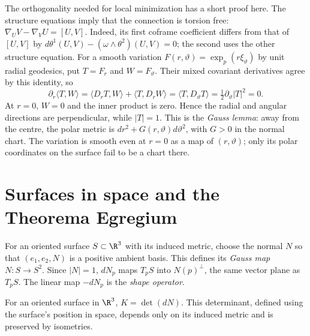 The orthogonality needed for local minimization has a short proof here. The structure equations imply that the connection is torsion free:
$\nabla_UV-\nabla_VU=[U,V]$. Indeed, its first coframe coefficient differs from that of $[U,V]$ by $d\theta^1(U,V)-(\omega\wedge\theta^2)(U,V)=0$; the second uses the other structure equation. For a smooth variation $F(r,\vartheta)=\exp_p(r\xi_\vartheta)$ by unit radial geodesics, put $T=F_r$ and $W=F_\vartheta$. Their mixed covariant derivatives agree by this identity, so
\[
\partial_r\langle T,W\rangle
=\langle D_rT,W\rangle+\langle T,D_rW\rangle
=\langle T,D_\vartheta T\rangle
=\tfrac12\partial_\vartheta|T|^2=0.
\]
At $r=0$, $W=0$ and the inner product is zero. Hence the radial and angular directions are perpendicular, while $|T|=1$. This is the \emph{Gauss lemma}: away from the centre, the polar metric is $dr^2+G(r,\vartheta)d\vartheta^2$, with $G>0$ in the normal chart. The variation is smooth even at $r=0$ as a map of $(r,\vartheta)$; only its polar coordinates on the surface fail to be a chart there.

\section{Surfaces in space and the Theorema Egregium}

For an oriented surface $S\subset\R^3$ with its induced metric, choose the normal $N$ so that $(e_1,e_2,N)$ is a positive ambient basis. This defines its \emph{Gauss map} $N:S\to S^2$. Since $|N|=1$, $dN_p$ maps $T_pS$ into $N(p)^\perp$, the same vector plane as $T_pS$. The linear map $-dN_p$ is the \emph{shape operator}.

\begin{theorem}\label{thm:egregium}
For an oriented surface in $\R^3$, $K=\det(dN)$. This determinant, defined using the surface's position in space, depends only on its induced metric and is preserved by isometries.
\end{theorem}

